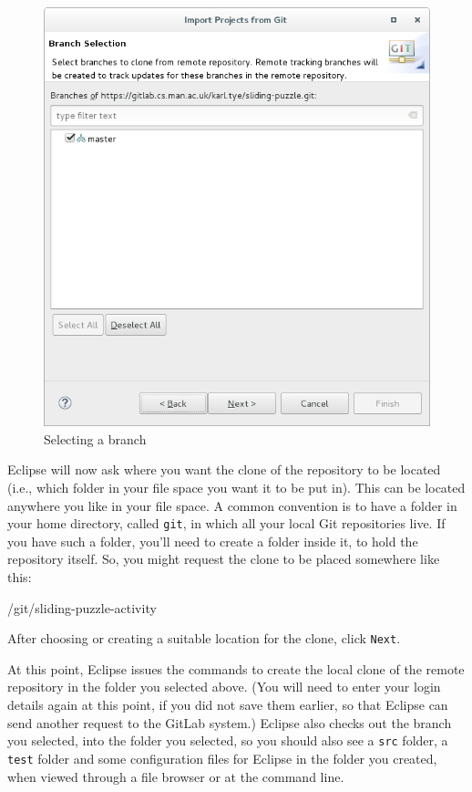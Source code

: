 \documentclass[
]{book}
\newenvironment{Shaded}{\begin{snugshade}}{\end{snugshade}}
\newcommand{\NormalTok}[1]{#1}
\begin{document}
\begin{figure}

{\centering \includegraphics[width=0.8\linewidth]{images/selectLocalBranchesForClone} 

}

\caption{Selecting a branch}\label{fig:selectLocalBranchesForClone-fig}
\end{figure}

Eclipse will now ask where you want the clone of the repository to be located (i.e., which folder in your file space you want it to be put in). This can be located anywhere you like in your file space. A common convention is to have a folder in your home directory, called \texttt{git}, in which all your local Git repositories live. If you have such a folder, you'll need to create a folder inside it, to hold the repository itself. So, you might request the clone to be placed somewhere like this:

\begin{Shaded}
\begin{Highlighting}[]
\NormalTok{/git/sliding{-}puzzle{-}activity}
\end{Highlighting}
\end{Shaded}

After choosing or creating a suitable location for the clone, click \texttt{Next}.

At this point, Eclipse issues the commands to create the local clone of the remote repository in the folder you selected above. (You will need to enter your login details again at this point, if you did not save them earlier, so that Eclipse can send another request to the GitLab system.) Eclipse also checks out the branch you selected, into the folder you selected, so you should also see a \texttt{src} folder, a \texttt{test} folder and some configuration files for Eclipse in the folder you created, when viewed through a file browser or at the command line.
\end{document}
